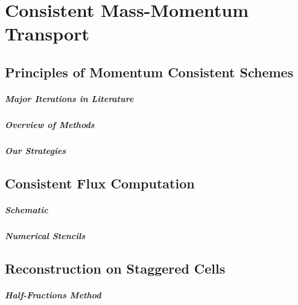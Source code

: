 \setchapterpreamble[u]{\margintoc}
\chapter{Consistent Mass-Momentum Transport}


\section{Principles of Momentum Consistent Schemes}

\paragraph{Major Iterations in Literature}
\blindtext

\paragraph{Overview of Methods}
\blindtext

\paragraph{Our Strategies}
\blindtext


\section{Consistent Flux Computation}

\paragraph{Schematic}
\blindtext

\paragraph{Numerical Stencils}
\blindtext


\section{Reconstruction on Staggered Cells}

\paragraph{Half-Fractions Method}
\blindtext

